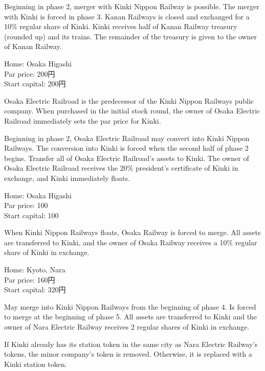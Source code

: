 \documentclass{article}
\begin{document}
\begin{CJK}{UTF8}{min}
\begin{multicols}{2}
\begin{description}
Beginning in phase 2, merger with Kinki Nippon Railway is
possible. The merger with Kinki is forced in phase 3. Kanan Railways
is closed and exchanged for a 10\% regular share of Kinki. Kinki
receives half of Kanan Railway treasury (rounded up) and its
trains. The remainder of the treasury is given to the owner of Kanan
Railway.

\item[2 Osaka Electric Railroad] \hfill

Home: Osaka Higashi \\
Par price: 200円 \\
Start capital: 200円

Osaka Electric Railroad is the predecessor of the Kinki Nippon
Railways public company. When purchased in the initial stock round,
the owner of Osaka Electric Railroad immediately sets the par price
for Kinki.

Beginning in phase 2, Osaka Electric Railroad may convert into Kinki
Nippon Railways. The conversion into Kinki is forced when the second
half of phase 2 begins. Transfer all of Osaka Electric Railroad's
assets to Kinki. The owner of Osaka Electric Railroad receives the
20\% president's certificate of Kinki in exchange, and Kinki
immediately floats.

\item[3 Osaka Railway] \hfill

Home: Osaka Higashi \\
Par price: 100 \\
Start capital: 100

When Kinki Nippon Railways floats, Osaka Railway is forced to
merge. All assets are transferred to Kinki, and the owner of Osaka
Railway receives a 10\% regular share of Kinki in exchange.

\item[4 Nara Electric Railway] \hfill

Home: Kyoto, Nara \\
Par price: 160円 \\
Start capital: 320円

May merge into Kinki Nippon Railways from the beginning of phase 4. Is
forced to merge at the beginning of phase 5. All assets are
transferred to Kinki and the owner of Nara Electric Railway receives 2
regular shares of Kinki in exchange.

If Kinki already has its station token in the same city as Nara
Electric Railway's tokens, the minor company's token is
removed. Otherwise, it is replaced with a Kinki station token.


\end{description}
\end{multicols}
\end{CJK}
\end{document}
